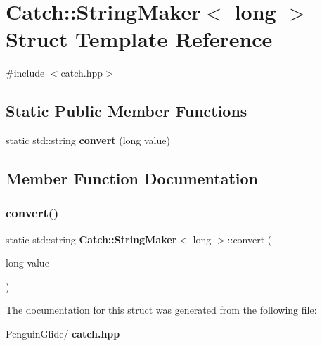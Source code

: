 \section{Catch\+::String\+Maker$<$ long $>$ Struct Template Reference}
\label{struct_catch_1_1_string_maker_3_01long_01_4}


{\ttfamily \#include $<$catch.\+hpp$>$}

\subsection*{Static Public Member Functions}
\begin{DoxyCompactItemize}
\item 
static std\+::string \textbf{ convert} (long value)
\end{DoxyCompactItemize}


\subsection{Member Function Documentation}
\mbox{\label{struct_catch_1_1_string_maker_3_01long_01_4_a1c0c56497813e7a6425c5411d5e66447}} 
\subsubsection{convert()}
{\footnotesize\ttfamily static std\+::string \textbf{ Catch\+::\+String\+Maker}$<$ long $>$\+::convert (\begin{DoxyParamCaption}\item[{long}]{value }\end{DoxyParamCaption})\hspace{0.3cm}{\ttfamily [static]}}



The documentation for this struct was generated from the following file\+:\begin{DoxyCompactItemize}
\item 
Penguin\+Glide/\textbf{ catch.\+hpp}\end{DoxyCompactItemize}
